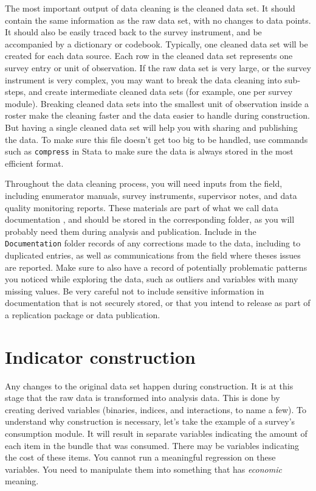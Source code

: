 The most important output of data cleaning is the cleaned data set. 
It should contain the same information as the raw data set,
with no changes to data points.
It should also be easily traced back to the survey instrument,
and be accompanied by a dictionary or codebook.
Typically, one cleaned data set will be created for each data source.
Each row in the cleaned data set represents one survey entry or unit of observation.
If the raw data set is very large, or the survey instrument is very complex,
you may want to break the data cleaning into sub-steps, 
and create intermediate cleaned data sets
(for example, one per survey module).
Breaking cleaned data sets into the smallest unit of observation inside a roster
make the cleaning faster and the data easier to handle during construction.
But having a single cleaned data set will help you with sharing and publishing the data.
To make sure this file doesn't get too big to be handled,
use commands such as \texttt{compress} in Stata to make sure the data
is always stored in the most efficient format.

Throughout the data cleaning process, you will need inputs from the field, 
including enumerator manuals, survey instruments, 
supervisor notes, and data quality monitoring reports.
These materials are part of what we call data documentation
,
and should be stored in the corresponding folder, 
as you will probably need them during analysis and publication.
Include in the \texttt{Documentation} folder records of any
corrections made to the data, including to duplicated entries,
as well as communications from the field where theses issues are reported.
Make sure to also have a record of potentially problematic patterns you noticed
while exploring the data, such as outliers and variables with many missing values.
Be very careful not to include sensitive information in 
documentation that is not securely stored, 
or that you intend to release as part of a replication package or data publication.

\section{Indicator construction}

Any changes to the original data set happen during construction.
It is at this stage that the raw data is transformed into analysis data.
This is done by creating derived variables
(binaries, indices, and interactions, to name a few).
To understand why construction is necessary,
let's take the example of a survey's consumption module.
It will result in separate variables indicating the 
amount of each item in the bundle that was consumed.
There may be variables indicating the cost of these items.
You cannot run a meaningful regression on these variables. 
You need to manipulate them into something that has \textit{economic} meaning. 

